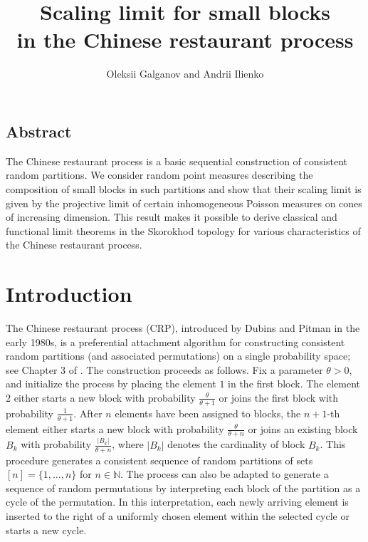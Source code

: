 \documentclass[11pt]{article}
\title{\bfseries Scaling limit for small blocks\\in the Chinese restaurant process}
\author{Oleksii Galganov and Andrii Ilienko}
\date{}
\newcommand{\abs}[1]{\left|#1\right|}
\newcommand{\N}{\mathbb{N}}
\newcommand{\1}[1][]{
	\ifx&#1&\mathds{1}
	\else\mathds{1}\left\{#1\right\}\fi}
\theoremstyle{definition}
\theoremstyle{remark}
\numberwithin{equation}{section}
\begin{document}
	\maketitle
	\begingroup
	\renewcommand\thefootnote{}
	\addtocounter{footnote}{-2}
	\endgroup
	\vspace{-25pt}
	
	\subsection*{Abstract}
			The Chinese restaurant process is a basic sequential construction of consistent random partitions. 
			We consider random point measures describing the composition of small blocks in such partitions and show that their 
			scaling limit is given by the projective limit of certain inhomogeneous Poisson measures on cones of increasing dimension. 
			This result makes it possible to derive classical and functional limit theorems in the Skorokhod topology 
			for various characteristics of the Chinese restaurant process.
	
	\section{Introduction}
	The Chinese restaurant process (CRP), introduced by Dubins and Pitman in the early 1980s, is a preferential attachment algorithm for constructing consistent random 
	partitions (and associated permutations) on a single probability space; see Chapter 3 of \cite{P06}. The construction proceeds as follows. Fix a parameter $\theta>0$, 
	and initialize the process by placing the element $1$ in the first block. The element $2$ either starts a new block with probability $\frac{\theta}{\theta+1}$ or joins 
	the first block with probability $\frac{1}{\theta+1}$. After $n$ elements have been assigned to blocks, the $n+1$-th element either starts a new block with probability 
	$\frac{\theta}{\theta+n}$ or joins an existing block $B_k$ with probability $\frac{\abs{B_k}}{\theta+n}$, where $\abs{B_k}$ denotes the cardinality of block $B_k$. 
	This procedure generates a consistent sequence of random partitions of sets $[n]=\{1,\dots,n\}$ for $n\in \N$. 
	The process can also be adapted to generate a sequence of random permutations by interpreting each block of the partition as a cycle of the permutation.
	In this interpretation, each newly arriving element is inserted to the right of a uniformly chosen element within the selected cycle or starts a new cycle.
		
\end{document}
